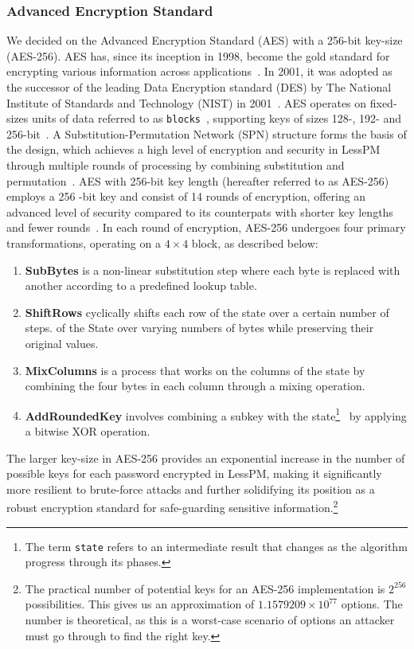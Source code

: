 \subsubsection{Advanced Encryption Standard}
We decided on the Advanced Encryption Standard (AES) with a 256-bit key-size
(AES-256).
AES has, since its inception in 1998, become the gold standard for encrypting
various information across
applications~\cite{schneier2015applied,rijndael_book}.
In 2001, it was adopted as the successor of the leading Data Encryption
standard (DES) by The National Institute of Standards and Technology (NIST)
in 2001~\cite{nist_aes_winner}.
AES operates on fixed-sizes units of data referred to as
\texttt{blocks}~\cite{nistfips197blocks}, supporting keys of sizes 128-, 192-
and 256-bit~\cite{nistfips197intro}.
A Substitution-Permutation Network (SPN) structure forms the basis of the
design, which achieves a high level of encryption and security in LessPM
through multiple rounds of processing by combining substitution and
permutation~\cite{nistfips197specification}.
AES with 256-bit key length (hereafter referred to as AES-256) employs a 256
-bit key and consist of 14 rounds of encryption, offering an advanced level
of security compared to its counterpats with shorter key lengths and fewer
rounds~\cite{nistfips197256}.
In each round of encryption, AES-256 undergoes four primary transformations,
operating on a $4\times4$ block, as described below:
\newpage
  \begin{enumerate}
    \item \textbf{SubBytes} is a non-linear substitution step where each byte is
    replaced with another according to a predefined lookup table.
    \item \textbf{ShiftRows} cyclically shifts each row of the state over a
    certain number of steps.
    of the State over varying numbers of bytes while preserving their original
    values.
    \item \textbf{MixColumns} is a process that works on the columns of the
    state by combining the four bytes in each column through a mixing operation.
    \item \textbf{AddRoundedKey} involves combining a subkey with the state\footnote{
      The term \texttt{state} refers to an intermediate result that changes as
      the algorithm progress through its phases.
    }
    ~by applying a bitwise XOR operation.
  \end{enumerate}
\newline
The larger key-size in AES-256 provides an exponential increase in the number
of possible keys for each password encrypted in LessPM, making it
significantly more resilient to brute-force attacks and further solidifying
its position as a robust encryption standard for safe-guarding sensitive
information.\footnote{
  The practical number of potential keys for an AES-256 implementation is
  $2^{256}$ possibilities. This gives us an approximation of
  $1.1579209 \times 10^{77}$ options.
  The number is theoretical, as this is a worst-case scenario of options an
  attacker must go through to find the right key.
}

